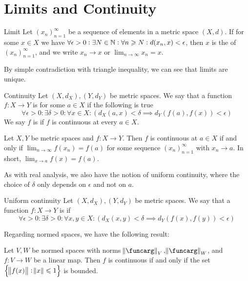 \documentclass{styles/tufte}
\begin{document}
\section{Limits and Continuity}

\begin{definition}{Limit}{}
  Let $(x_n)_{n=1}^\infty$ be a sequence of elements in a metric space $(X, d)$. If for some $x \in X$ we have $\forall \epsilon > 0: \exists N \in \NN: \forall n \geqslant N: d(x_n, x) < \epsilon$, then $x$ is the  of $(x_n)_{n=1}^\infty$, and we write $x_n \to x$ or $\lim_{n \to \infty} x_n = x$.
\end{definition}

By simple contradiction with triangle inequality, we can see that limits are unique.

\begin{definition}{Continuity}{}
  Let $(X, d_X), (Y, d_Y)$ be metric spaces. We say that a function $f: X \to Y$ is  for some $a \in X$ if the following is true
  \[ \forall \epsilon > 0: \exists \delta > 0: \forall x \in X: \left( d_X(a, x) < \delta \implies d_Y(f(a), f(x)) < \epsilon \right) \]
  We say $f$ is  if $f$ is continuous at every $a \in X$.
\end{definition}

\begin{lemma}{}{}
  Let $X, Y$ be metric spaces and $f: X \to Y$. Then $f$ is continuous at $a \in X$ if and only if $\lim_{n \to \infty} f(x_n) = f(a)$ for some sequence $(x_n)_{n=1}^\infty$ with $x_n \to a$. In short, $\lim_{x \to a} f(x) = f(a)$.
\end{lemma}

As with real analysis, we also have the notion of uniform continuity, where the choice of $\delta$ only depends on $\epsilon$ and not on $a$.

\begin{definition}{Uniform continuity}{}
  Let $(X, d_X), (Y, d_Y)$ be metric spaces. We say that a function $f: X \to Y$ is  if
  \[ \forall \epsilon > 0: \exists \delta > 0: \forall x, y \in X: \left( d_X(x, y) < \delta \implies d_Y(f(x), f(y)) < \epsilon \right) \]
\end{definition}

Regarding normed spaces, we have the following result:

\begin{lemma}{}{}
  Let $V, W$ be normed spaces with norms $\norm{\funcarg}_V, \norm{\funcarg}_W$, and $f: V \to W$ be a linear map. Then $f$ is continuous if and only if the set $\set{\norm{f(x)}: \norm{x} \leqslant 1}$ is bounded.
\end{lemma}
\end{document}
